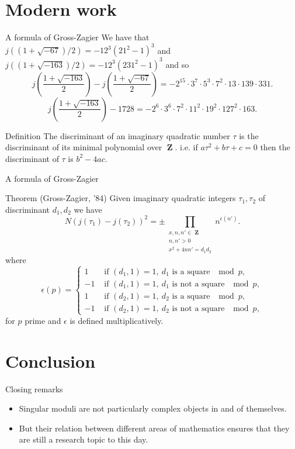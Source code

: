 \documentclass{beamer}
\DeclareMathOperator{\ZZ}{\mathbf{Z}}
\begin{document}
\section{Modern work}
\begin{frame}{A formula of Gross-Zagier}
We have that $j((1+\sqrt{-67})/2) = -12^3(21^2 - 1)^3$ and $j((1+\sqrt{-163})/2) = -12^3(231^2 - 1)^3$ and so
\[
j\left(\frac{1+\sqrt{-163}}{2}\right) - j\left(\frac{1+\sqrt{-67}}{2}\right) = -2^{15}\cdot 3^7\cdot 5^3 \cdot 7^2\cdot 13\cdot 139\cdot 331.
\]
\pause
\[
j\left(\frac{1+\sqrt{-163}}{2}\right) - 1728 = -2^6\cdot3^6\cdot7^2\cdot11^2\cdot19^2\cdot127^2\cdot163.
\]
\pause
\begin{block}{Definition}
The discriminant of an imaginary quadratic number $\tau$ is the discriminant of its minimal polynomial over $\ZZ$.
i.e. if $a\tau^2 + b\tau + c = 0$ then the discriminant of $\tau$ is $b^2 - 4ac$.
\end{block}
\end{frame}

\begin{frame}{A formula of Gross-Zagier}
\begin{block}{Theorem (Gross-Zagier, '84)}
Given imaginary quadratic integers $\tau_1,\tau_2$ of discriminant $d_1,d_2$ we have
\[
N(j(\tau_1) - j(\tau_2))^2 = \pm\prod_{ \substack{x,n,n'\in\ZZ \\ n,n'> 0 \\ x^2 +4nn' = d_1d_2}} n^{\epsilon(n')}.
\]
where
\[
\epsilon(p) = \begin{cases}
1 &\text{ if } (d_1,1) = 1,\ d_1\text{ is a square }\mod{p},\\
-1 &\text{ if } (d_1,1) = 1,\ d_1\text{ is not a square }\mod{p},\\
1 &\text{ if } (d_2,1) = 1,\ d_2\text{ is a square }\mod{p},\\
-1 &\text{ if } (d_2,1) = 1,\ d_2\text{ is not a square }\mod{p},
\end{cases}
\]
for $p$ prime and $\epsilon$ is defined multiplicatively.
\end{block}
\end{frame}

\section{Conclusion}
\begin{frame}{Closing remarks}
\begin{itemize}
\item Singular moduli are not particularly complex objects in and of themselves.
\pause \item But their relation between different areas of mathematics ensures that they are still a research topic to this day.
\end{itemize}
\end{frame}
\end{document}
